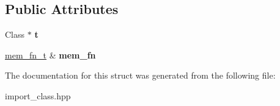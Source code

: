\subsection*{Public Attributes}
\begin{DoxyCompactItemize}
\item 
Class $\ast$ {\bfseries t}\hypertarget{a00217_a0f97c51dfca93a4764899a384228cfac}{}\label{a00217_a0f97c51dfca93a4764899a384228cfac}

\item 
\hyperlink{a00211}{mem\+\_\+fn\+\_\+t} \& {\bfseries mem\+\_\+fn}\hypertarget{a00217_a96f3841b075c1e9e2bf3793d1d7da316}{}\label{a00217_a96f3841b075c1e9e2bf3793d1d7da316}

\end{DoxyCompactItemize}


The documentation for this struct was generated from the following file\+:\begin{DoxyCompactItemize}
\item 
import\+\_\+class.\+hpp\end{DoxyCompactItemize}
